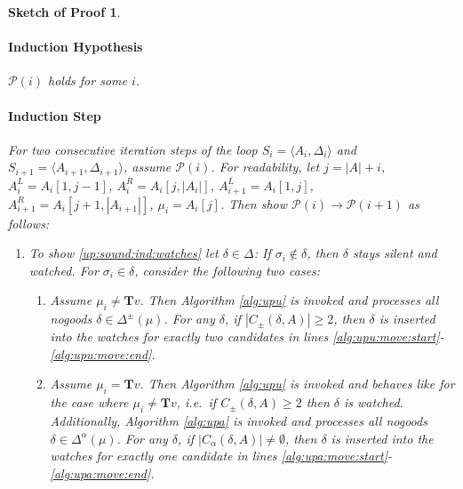 \documentclass{vutinfth} %
\newtheorem{proof-sketch}{Sketch of Proof}[chapter]
\newcommand{\ass}{A}
\newcommand{\bT}{\mathbf{T}}
\newcommand{\cdpm}{C_\pm}
\newcommand{\cdal}{C_\alpha}
\newcommand{\dpm}{\Delta^\pm}
\newcommand{\dal}{\Delta^\alpha}
\newcommand{\welf}{well formed\xspace}
\newcommand{\sgl}{\mu}
\newcommand{\bsgl}{\sigma}
\begin{document}
\begin{proof-sketch}

\paragraph{Induction Hypothesis} $\mathcal{P}(i)$ holds for some $i$.

\paragraph{Induction Step} For two consecutive iteration steps of the loop $S_{i} = \langle \ass_{i}, \Delta_{i} \rangle$ and $S_{i+1} = \langle \ass_{i+1}, \Delta_{i+1} \rangle$, assume $\mathcal{P}(i)$. For readability, let $j = |A| + i$, $\ass_i^L = \ass_i[1, j - 1]$, $\ass_i^R = \ass_i[j, |\ass_i|]$, $\ass_{i+1}^L = \ass_i[1, j]$, $\ass_{i+1}^R = \ass_i[j + 1,|\ass_{i+1}|]$, $\sgl_i = A_i[j]$. Then show $\mathcal{P}(i) \to \mathcal{P}(i + 1)$ as follows:

\begin{enumerate}
\item To show \ref{up:sound:ind:watches} let $\delta \in \Delta$: %
If $\bsgl_i \not \in \delta$, then $\delta$ stays silent and watched. For $\bsgl_i \in \delta$, consider the following two cases:
\begin{enumerate}
	\item Assume $\sgl_i \not = \bT v$. Then Algorithm \ref{alg:upu} is invoked and processes all nogoods $\delta \in \dpm(\sgl)$. For any $\delta$, if $|\cdpm(\delta, A)| \geq 2$, then $\delta$ is inserted into the watches for exactly two candidates in lines \ref{alg:upu:move:start}-\ref{alg:upu:move:end}.
	\item Assume $\sgl_i = \bT v$. Then Algorithm \ref{alg:upu} is invoked and behaves like for the case where $\sgl_i \not = \bT v$, i.e.~if $\cdpm(\delta,\ass) \geq 2$ then $\delta$ is watched. Additionally, Algorithm \ref{alg:upa} is invoked and processes all nogoods $\delta \in \dal(\sgl)$. For any $\delta$, if $|\cdal(\delta, A)| \not = \emptyset$, then $\delta$ is inserted into the watches for exactly one candidate in lines \ref{alg:upa:move:start}-\ref{alg:upa:move:end}. 
\end{enumerate}


\end{enumerate}
\end{proof-sketch}
\end{document}
